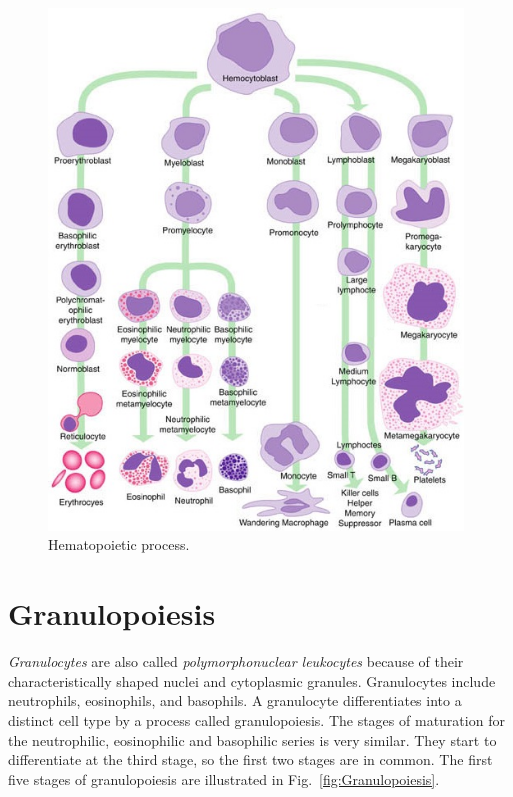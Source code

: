 \begin{figure}[!htbp]
	\centering
	\includegraphics[width=0.98\textwidth]{images/Hematopoiesis}
	\caption{\label{fig:Haematopoiesis} Hematopoietic process.}
\end{figure}

\section{Granulopoiesis}
\textit{Granulocytes} are also called \textit{polymorphonuclear leukocytes} because of their characteristically shaped nuclei and cytoplasmic granules. Granulocytes include neutrophils, eosinophils, and basophils. A granulocyte differentiates into a distinct cell type by a process called granulopoiesis. The stages of maturation for the neutrophilic, eosinophilic and basophilic series is very similar. They start to differentiate at the third stage, so the first two stages are in common. The first five stages of granulopoiesis are illustrated in Fig.~\ref{fig:Granulopoiesis}.

